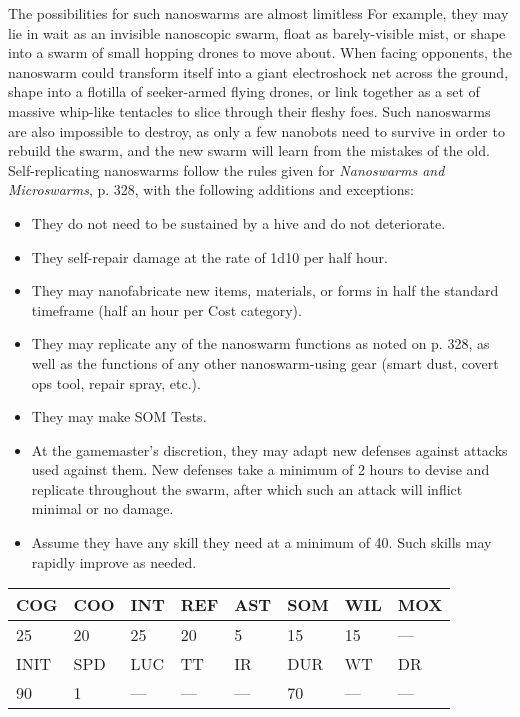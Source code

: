 The possibilities for such nanoswarms are almost limitless For example, they may lie in wait as an invisible nanoscopic swarm, float as barely-visible mist, or shape into a swarm of small hopping drones to move about. When facing opponents, the nanoswarm could transform itself into a giant electroshock net across the ground, shape into a flotilla of seeker-armed flying drones, or link together as a set of massive whip-like tentacles to slice through their fleshy foes. Such nanoswarms are also impossible to destroy, as only a few nanobots need to survive in order to rebuild the swarm, and the new swarm will learn from the mistakes of the old. Self-replicating nanoswarms follow the rules given for \textit{Nanoswarms and Microswarms}, p. 328, with the following additions and exceptions: 

\begin{itemize} \item They do not need to be sustained by a hive and do not deteriorate. \item They self-repair damage at the rate of 1d10 per half hour. \item They may nanofabricate new items, materials, or forms in half the standard timeframe (half an hour per Cost category). \item They may replicate any of the nanoswarm functions as noted on p. 328, as well as the functions of any other nanoswarm-using gear (smart dust, covert ops tool, repair spray, etc.). \item They may make SOM Tests. \item At the gamemaster's discretion, they may adapt new defenses against attacks used against them. New defenses take a minimum of 2 hours to devise and replicate throughout the swarm, after which such an attack will inflict minimal or no damage. \item Assume they have any skill they need at a minimum of 40. Such skills may rapidly improve as needed. \end{itemize} 

\begin{tabular}{|l|l|l|l|l|l|l|l|} \hline

COG &COO &INT &REF &AST &SOM &WIL &MOX \\ \hline

25 &20 &25 &20 &5 &15 &15 &— \\ \hline

INIT &SPD &LUC &TT &IR &DUR &WT &DR \\ \hline

90 &1 &— &— &— &70 &— &— \\ \hline

\end{tabular} 





